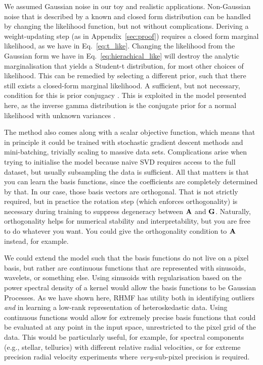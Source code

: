 \documentclass[onecolumn,floatfix,linenumbers,trackchanges]{aastex631}
\begin{document}
We assumed Gaussian noise in our toy and realistic applications. 
Non-Gaussian noise that is described by a known and closed form distribution can be handled by changing the likelihood function, but not without complications.
Deriving a weight-updating step (as in Appendix~\ref{sec:proof}) requires a closed form marginal likelihood, as we have in Eq.~\eqref{eq:t_like}.
Changing the likelihood from the Gaussian form we have in Eq.~\eqref{eq:hierachical_like} will destroy the analytic marginalisation that yields a Student-t distribution, for most other choices of likelihood.
This can be remedied by selecting a different prior, such that there still exists a closed-form marginal likelihood.
A sufficient, but not necessary, condition for this is prior conjugacy \citep{andrews1974,diaconis1979,west1987}.
This is exploited in the model presented here, as the inverse gamma distribution is the conjugate prior for a normal likelihood with unknown variances \citep[e.g.][]{bernardo2009bayesian}.


The method also comes along with a scalar objective function, which means that in principle it could be trained with stochastic gradient descent methods and mini-batching, trivially scaling to massive data sets. 
Complications arise when trying to initialise the model because naive SVD requires access to the full dataset, but usually subsampling the data is sufficient. All that matters is that you can learn the basis functions, since the coefficients are completely determined by that. In our case, those basis vectors are orthogonal.  That is not strictly required, but in practice the rotation step (which enforces orthogonality) is necessary during training to suppress degeneracy between ${\bf A}$ and ${\bf G}$. Naturally, orthogonality helps for numerical stability and interpretability, but you are free to do whatever you want. You could give the orthogonality condition to ${\bf A}$ instead, for example.

We could extend the model such that the basis functions do not live on a pixel basis, but rather are continuous functions that are represented with sinusoids, wavelets, or something else.
Using sinusoids with regularisation based on the power spectral density of a kernel would allow the basis functions to be Gaussian Processes. 
As we have shown here, RHMF has utility both in identifying outliers \emph{and} in learning a low-rank representation of heteroskedastic data. Using continuous functions would allow for extremely precise basis functions that could be evaluated at any point in the input space, unrestricted to the pixel grid of the data. This would be particularly useful, for example, for spectral components (e.g., stellar, tellurics) with different relative radial velocities, or for extreme precision radial velocity experiments where \emph{very-}sub-pixel precision is required.
\end{document}
